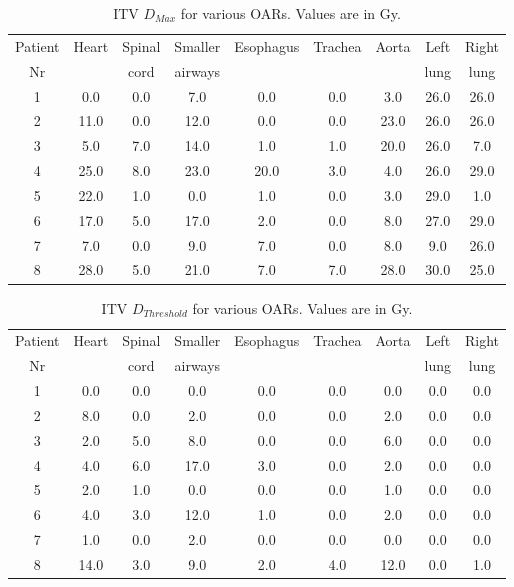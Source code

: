 \begin{table}[H]
  \centering
  \caption{ITV $D_{Max}$ for various OARs. Values are in Gy.}
  \begin{tabular}{c|c|c|c|c|c|c|c|c}
   Patient & \multirow{2}{*}{Heart} & Spinal  & Smaller  & \multirow{2}{*}{Esophagus} & \multirow{2}{*}{Trachea} & \multirow{2}{*}{Aorta} & Left  & Right \\
   Nr & & cord & airways & & & & lung & lung \\
 \hline\hline 
1 & 0.0 & 0.0 & 7.0 & 0.0 & 0.0 & 3.0 & 26.0 & 26.0 \\ 
2 & 11.0 & 0.0 & 12.0 & 0.0 & 0.0 & 23.0 & 26.0 & 26.0 \\ 
3 & 5.0 & 7.0 & 14.0 & 1.0 & 1.0 & 20.0 & 26.0 & 7.0 \\ 
4 & 25.0 & 8.0 & 23.0 & 20.0 & 3.0 & 4.0 & 26.0 & 29.0 \\ 
5 & 22.0 & 1.0 & 0.0 & 1.0 & 0.0 & 3.0 & 29.0 & 1.0 \\ 
6 & 17.0 & 5.0 & 17.0 & 2.0 & 0.0 & 8.0 & 27.0 & 29.0 \\ 
7 & 7.0 & 0.0 & 9.0 & 7.0 & 0.0 & 8.0 & 9.0 & 26.0 \\ 
8 & 28.0 & 5.0 & 21.0 & 7.0 & 7.0 & 28.0 & 30.0 & 25.0 \\ 
\hline\hline
  \end{tabular}
  \label{tab:oarlimits1}
\end{table}

\begin{table}[H]
  \centering
  \caption{ITV $D_{Threshold}$ for various OARs. Values are in Gy.}
  \begin{tabular}{c|c|c|c|c|c|c|c|c}
   Patient & \multirow{2}{*}{Heart} & Spinal  & Smaller  & \multirow{2}{*}{Esophagus} & \multirow{2}{*}{Trachea} & \multirow{2}{*}{Aorta} & Left  & Right \\
   Nr & & cord & airways & & & & lung & lung \\
 \hline\hline 
1 & 0.0 & 0.0 & 0.0 & 0.0 & 0.0 & 0.0 & 0.0 & 0.0 \\ 
2 & 8.0 & 0.0 & 2.0 & 0.0 & 0.0 & 2.0 & 0.0 & 0.0 \\ 
3 & 2.0 & 5.0 & 8.0 & 0.0 & 0.0 & 6.0 & 0.0 & 0.0 \\ 
4 & 4.0 & 6.0 & 17.0 & 3.0 & 0.0 & 2.0 & 0.0 & 0.0 \\ 
5 & 2.0 & 1.0 & 0.0 & 0.0 & 0.0 & 1.0 & 0.0 & 0.0 \\ 
6 & 4.0 & 3.0 & 12.0 & 1.0 & 0.0 & 2.0 & 0.0 & 0.0 \\ 
7 & 1.0 & 0.0 & 2.0 & 0.0 & 0.0 & 0.0 & 0.0 & 0.0 \\ 
8 & 14.0 & 3.0 & 9.0 & 2.0 & 4.0 & 12.0 & 0.0 & 1.0 \\ 

\hline\hline
  \end{tabular}
  \label{tab:oarlimits1}
\end{table}

